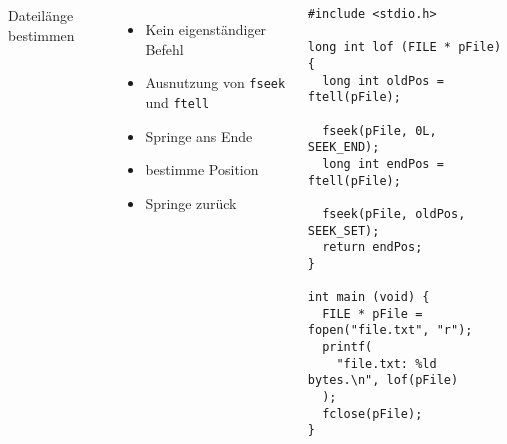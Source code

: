 \begin{frame}[fragile]
%
\begin{columns}[T]
\begin{Large}
Dateilänge bestimmen
\vspace{10pt}
\end{Large}
%
\begin{itemize}
\item Kein eigenständiger Befehl
\item Ausnutzung von \texttt{fseek} und \texttt{ftell}
\item Springe ans Ende
\item bestimme Position 
\item Springe zurück
\end{itemize}
%
\begin{codebox}
\begin{verbatim}
#include <stdio.h>

long int lof (FILE * pFile) {
  long int oldPos = ftell(pFile);
  
  fseek(pFile, 0L, SEEK_END);
  long int endPos = ftell(pFile);
  
  fseek(pFile, oldPos, SEEK_SET);
  return endPos;
}

int main (void) {
  FILE * pFile = fopen("file.txt", "r");  
  printf(
    "file.txt: %ld bytes.\n", lof(pFile)
  );
  fclose(pFile);
}
\end{verbatim}
\end{codebox}
\end{columns}
%
\end{frame}
